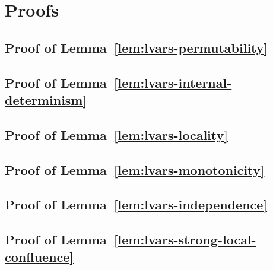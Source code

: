 \chapter{Proofs}\label{app:proofs}

\section{Proof of Lemma~\ref{lem:lvars-permutability}}\label{section:lvars-permutability-proof}


\section{Proof of Lemma~\ref{lem:lvars-internal-determinism}}\label{section:lvars-internal-determinism-proof}


\section{Proof of Lemma~\ref{lem:lvars-locality}}\label{section:lvars-locality-proof}


\section{Proof of Lemma~\ref{lem:lvars-monotonicity}}\label{section:lvars-monotonicity-proof}


\section{Proof of Lemma~\ref{lem:lvars-independence}}\label{section:lvars-independence-proof}




\section{Proof of Lemma~\ref{lem:lvars-strong-local-confluence}}\label{section:lvars-strong-local-confluence-proof}


